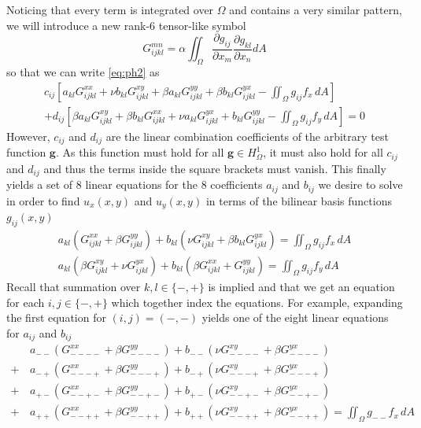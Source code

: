 \documentclass[11pt]{article}
\newcommand\p[2]{\frac{\partial #1}{\partial #2}}
\begin{document}
Noticing that every term is integrated over $\Omega$ and contains a very similar pattern, we will introduce a new rank-6 tensor-like symbol
\begin{equation}
  G_{ijkl}^{mn} = \alpha \iint_\Omega \p{g_{ij}}{x_m} \p{g_{kl}}{x_n} dA
\end{equation}
so that we can write \eqref{eq:ph2} as
\begin{multline}
    c_{ij} \left[
      a_{kl} G_{ijkl}^{xx} + \nu b_{kl} G_{ijkl}^{xy}
      + \beta a_{kl} G_{ijkl}^{yy} + \beta b_{kl} G_{ijkl}^{yx}
      - \iint_\Omega g_{ij}f_x \, dA
    \right] \\
  + d_{ij} \left[
    \beta a_{kl} G_{ijkl}^{xy} + \beta b_{kl} G_{ijkl}^{xx}
    + \nu a_{kl} G_{ijkl}^{yx} + b_{kl} G_{ijkl}^{yy}
    - \iint_\Omega g_{ij}f_y \, dA
  \right] = 0
\end{multline}
However, $c_{ij}$ and $d_{ij}$ are the linear combination coefficients of the arbitrary test function $\bm{g}$. As this function must hold for all $\bm{g} \in H^1_\Omega$, it must also hold for all $c_{ij}$ and $d_{ij}$ and thus the terms inside the square brackets must vanish. This finally yields a set of 8 linear equations for the 8 coefficients $a_{ij}$ and $b_{ij}$ we desire to solve in order to find $u_x(x,y)$ and $u_y(x,y)$ in terms of the bilinear basis functions $g_{ij}(x,y)$
\begin{subequations}
\begin{gather}
  a_{kl} \left( G_{ijkl}^{xx} + \beta G_{ijkl}^{yy} \right)
    + b_{kl} \left( \nu G_{ijkl}^{xy} + \beta b_{kl} G_{ijkl}^{yx} \right)
    = \iint_\Omega g_{ij}f_x \, dA \\
  a_{kl} \left( \beta G_{ijkl}^{xy} + \nu G_{ijkl}^{yx} \right)
    + b_{kl} \left( \beta G_{ijkl}^{xx} + G_{ijkl}^{yy} \right)
    = \iint_\Omega g_{ij}f_y \, dA
\end{gather}
\end{subequations}
Recall that summation over $k,l \in \{-,+\}$ is implied and that we get an equation for each $i,j \in \{-,+\}$ which together index the equations. For example, expanding the first equation for $(i,j) =(-,-)$ yields one of the eight linear equations for $a_{ij}$ and $b_{ij}$
\begin{equation}
\begin{aligned}
  & a_{--} \left( G_{----}^{xx} + \beta G_{----}^{yy} \right)
  + b_{--} \left( \nu G_{----}^{xy} + \beta G_{----}^{yx} \right) \\
  + \, & a_{-+} \left( G_{---+}^{xx} + \beta G_{---+}^{yy} \right)
  + b_{-+} \left( \nu G_{---+}^{xy} + \beta G_{---+}^{yx} \right) \\
  + \, & a_{+-} \left( G_{--+-}^{xx} + \beta G_{--+-}^{yy} \right)
  + b_{+-} \left( \nu G_{--+-}^{xy} + \beta G_{--+-}^{yx} \right)  \\
  + \, & a_{++} \left( G_{--++}^{xx} + \beta G_{--++}^{yy} \right)
  + b_{++} \left( \nu G_{--++}^{xy} + \beta G_{--++}^{yx} \right)
  = \iint_\Omega g_{--}f_x \, dA
\end{aligned}
\end{equation}
\end{document}
